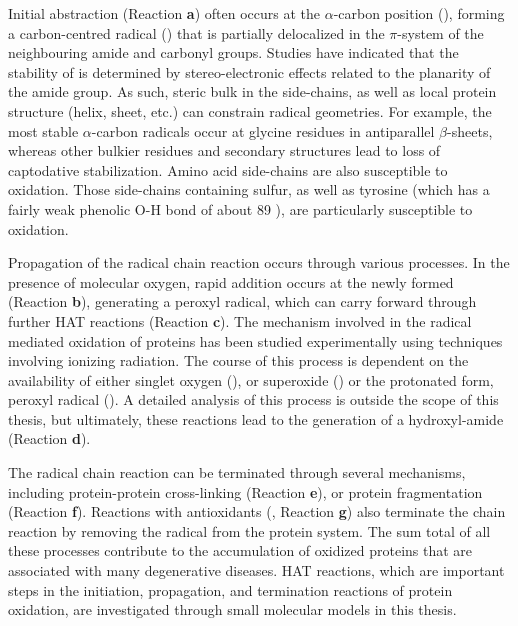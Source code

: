 \begin{doublespace}
Initial abstraction (Reaction \textbf{a}) often occurs at the $\alpha$-carbon
position (), forming a carbon-centred radical
() that is partially delocalized in the $\pi$-system of the
neighbouring amide and carbonyl groups. Studies have indicated that the
stability of  is determined by stereo-electronic effects
related to the planarity of the amide group.\cite{Salamone2014b} As such, steric
bulk in the side-chains, as well as local protein structure (helix, sheet, etc.)
can constrain radical geometries. For example, the most stable $\alpha$-carbon
radicals occur at glycine residues in antiparallel $\beta$-sheets, whereas other
bulkier residues and secondary structures lead to loss of captodative
stabilization.\cite{Rauk2000} Amino acid side-chains are also susceptible to
oxidation. Those side-chains containing sulfur,\cite{Stadtman2004} as well as
tyrosine (which has a fairly weak phenolic O-H bond of about 89
\kcalmol),\cite{Mulder2005} are particularly susceptible to oxidation.

Propagation of the radical chain reaction occurs through various processes. In
the presence of molecular oxygen, rapid addition occurs at the newly formed
 (Reaction \textbf{b}), generating a peroxyl radical, which can
carry forward through further HAT reactions (Reaction
\textbf{c}).\cite{Stadtman2003} The mechanism involved in the radical mediated
oxidation of proteins has been studied experimentally using techniques involving
ionizing radiation.\cite{Garrison1962,Garrison1987} The course of this process
is dependent on the availability of either singlet oxygen (), or
superoxide () or the protonated form, peroxyl radical ().
A detailed analysis of this process is outside the scope of this thesis, but
ultimately, these reactions lead to the generation of a hydroxyl-amide (Reaction
\textbf{d}).

The radical chain reaction can be terminated through several mechanisms,
including protein-protein cross-linking (Reaction \textbf{e}), or protein
fragmentation (Reaction \textbf{f}). Reactions with antioxidants (,
Reaction \textbf{g}) also terminate the chain reaction by removing the radical
from the protein system. The sum total of all these processes contribute to the
accumulation of oxidized proteins that are associated with many degenerative
diseases.\cite{Halliwell2006} HAT reactions, which are important steps in the
initiation, propagation, and termination reactions of protein oxidation, are
investigated through small molecular models in this thesis.


\end{doublespace}
